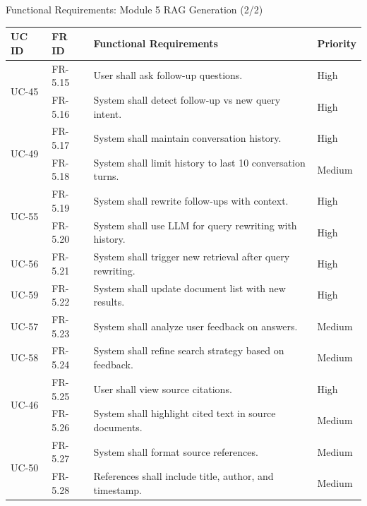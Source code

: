 \documentclass[aspectratio=169,xcolor=dvipsnames]{beamer}
\begin{document}
\begin{frame}{Functional Requirements: Module 5 RAG Generation (2/2)}
    \tiny
    \renewcommand{\arraystretch}{0.66}
    \begin{table}
        \centering
        \begin{tabular}{p{}|p{}|p{}|p{}}
        \toprule
        \textbf{UC ID} & \textbf{FR ID} & \textbf{Functional Requirements} & \textbf{Priority} \\
        \midrule
        \multirow{2}{*}{UC-45} & FR-5.15 & User shall ask follow-up questions. & High \\
        & FR-5.16 & System shall detect follow-up vs new query intent. & High \\
        \midrule
        \multirow{2}{*}{UC-49} & FR-5.17 & System shall maintain conversation history. & High \\
        & FR-5.18 & System shall limit history to last 10 conversation turns. & Medium \\
        \midrule
        \multirow{2}{*}{UC-55} & FR-5.19 & System shall rewrite follow-ups with context. & High \\
        & FR-5.20 & System shall use LLM for query rewriting with history. & High \\
        \midrule
        UC-56 & FR-5.21 & System shall trigger new retrieval after query rewriting. & High \\
        \midrule
        UC-59 & FR-5.22 & System shall update document list with new results. & High \\
        \midrule
        UC-57 & FR-5.23 & System shall analyze user feedback on answers. & Medium \\
        \midrule
        UC-58 & FR-5.24 & System shall refine search strategy based on feedback. & Medium \\
        \midrule
        \multirow{2}{*}{UC-46} & FR-5.25 & User shall view source citations. & High \\
        & FR-5.26 & System shall highlight cited text in source documents. & Medium \\
        \midrule
        \multirow{2}{*}{UC-50} & FR-5.27 & System shall format source references. & Medium \\
        & FR-5.28 & References shall include title, author, and timestamp. & Medium \\
        \bottomrule
        \end{tabular}
    \end{table}
\end{frame}
\end{document}
